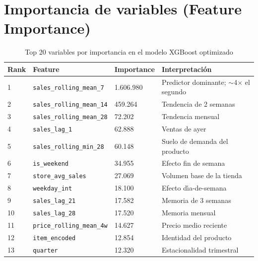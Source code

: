 \documentclass[12pt, a4paper, oneside]{report}
\newcommand{\code}[1]{\texttt{\small\color{codeblue}#1}}
\begin{document}
\section{Importancia de variables (Feature Importance)}

\begin{table}[H]
  \centering
  \caption{Top 20 variables por importancia en el modelo XGBoost optimizado}
  \label{tab:feature_importance}
  \begin{tabularx}{\textwidth}{C{1.2cm} L{4.5cm} C{2.8cm} X}
    \toprule
    {\color{white}\textbf{Rank}} &
    {\color{white}\textbf{Feature}} &
    {\color{white}\textbf{Importance}} &
    {\color{white}\textbf{Interpretaci\'on}} \\
    \midrule
       1  & \code{sales\_rolling\_mean\_7}    & 1.606.980 & Predictor dominante; $\sim$4$\times$ el segundo \\
      2  & \code{sales\_rolling\_mean\_14}   & 459.264   & Tendencia de 2 semanas \\
       3  & \code{sales\_rolling\_mean\_28}   & 72.202    & Tendencia mensual \\
      4  & \code{sales\_lag\_1}              & 62.888    & Ventas de ayer \\
       5  & \code{sales\_rolling\_min\_28}    & 60.148    & Suelo de demanda del producto \\
      6  & \code{is\_weekend}                & 34.955    & Efecto fin de semana \\
       7  & \code{store\_avg\_sales}          & 27.069    & Volumen base de la tienda \\
      8  & \code{weekday\_int}               & 18.100    & Efecto d\'{\i}a-de-semana \\
       9  & \code{sales\_lag\_21}             & 17.582    & Memoria de 3 semanas \\
      10 & \code{sales\_lag\_28}             & 17.520    & Memoria mensual \\
       11 & \code{price\_rolling\_mean\_4w}   & 14.627    & Precio medio reciente \\
      12 & \code{item\_encoded}              & 12.854    & Identidad del producto \\
       13 & \code{quarter}                   & 12.320    & Estacionalidad trimestral \\

\end{tabularx}
\end{table}
\end{document}
